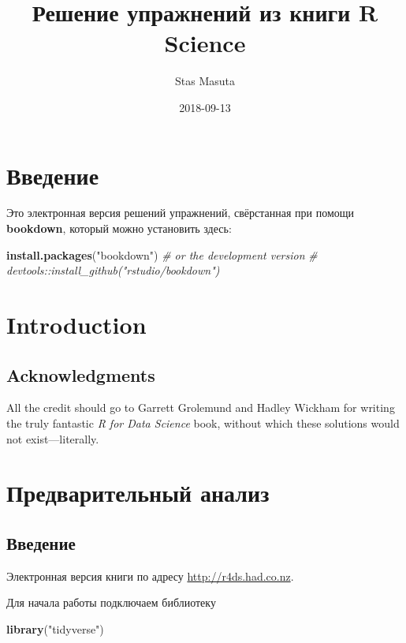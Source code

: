 \documentclass[]{book}
\title{Решение упражнений из книги R Science}
\author{Stas Masuta}
\date{2018-09-13}
\newenvironment{Shaded}{\begin{snugshade}}{\end{snugshade}}
\newcommand{\KeywordTok}[1]{\textcolor[rgb]{0.13,0.29,0.53}{\textbf{#1}}}
\newcommand{\StringTok}[1]{\textcolor[rgb]{0.31,0.60,0.02}{#1}}
\newcommand{\CommentTok}[1]{\textcolor[rgb]{0.56,0.35,0.01}{\textit{#1}}}
\newcommand{\NormalTok}[1]{#1}
\begin{document}
\maketitle

{
\setcounter{tocdepth}{1}
\tableofcontents
}
\chapter{Введение}

Это электронная версия решений упражнений, свёрстанная при помощи
\textbf{bookdown}, который можно установить здесь:

\begin{Shaded}
\begin{Highlighting}[]
\KeywordTok{install.packages}\NormalTok{(}\StringTok{"bookdown"}\NormalTok{)}
\CommentTok{# or the development version}
\CommentTok{# devtools::install_github("rstudio/bookdown")}
\end{Highlighting}
\end{Shaded}

\chapter{Introduction}\label{introduction}

\section*{Acknowledgments}\label{acknowledgments}

All the credit should go to Garrett Grolemund and Hadley Wickham for
writing the truly fantastic \emph{R for Data Science} book, without
which these solutions would not exist---literally.

\chapter{Предварительный анализ}\label{-}

\section{Введение}\label{-1}

Электронная версия книги по адресу \url{http://r4ds.had.co.nz}.

Для начала работы подключаем библиотеку

\begin{Shaded}
\begin{Highlighting}[]
\KeywordTok{library}\NormalTok{(}\StringTok{"tidyverse"}\NormalTok{)}
\end{Highlighting}
\end{Shaded}
\end{document}
